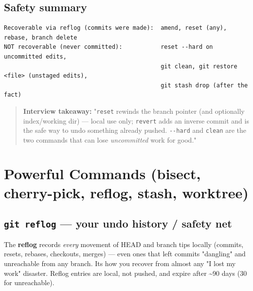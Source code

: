 \documentclass[11pt]{article}
\newenvironment{Shaded}{\begin{snugshade}}{\end{snugshade}}
\newcommand{\ExtensionTok}[1]{\textcolor[rgb]{0.00,0.60,1.00}{\textbf{#1}}}
\newcommand{\NormalTok}[1]{\textcolor[rgb]{0.81,0.81,0.76}{#1}}
\begin{document}
\subsection{Safety summary}\label{safety-summary}

\setcodelang{}

\begin{verbatim}
Recoverable via reflog (commits were made):  amend, reset (any), rebase, branch delete
NOT recoverable (never committed):           reset --hard on uncommitted edits,
                                             git clean, git restore <file> (unstaged edits),
                                             git stash drop (after the fact)
\end{verbatim}

\begin{quote}
\textbf{Interview takeaway:} "\texttt{reset} rewinds the branch pointer (and optionally index/working dir) --- local use only; \texttt{revert} adds an inverse commit and is the safe way to undo something already pushed. \texttt{-\/-hard} and \texttt{clean} are the two commands that can lose \emph{uncommitted} work for good."
\end{quote}

\section{Powerful Commands (bisect, cherry-pick, reflog, stash, worktree)}\label{powerful-commands-bisect-cherry-pick-reflog-stash-worktree}

\subsection{\texorpdfstring{\texttt{git\ reflog} --- your undo history / safety net}{git reflog --- your undo history / safety net}}\label{git-reflog--your-undo-history--safety-net}

The \textbf{reflog} records \emph{every} movement of HEAD and branch tips locally (commits, resets, rebases, checkouts, merges) --- even ones that left commits "dangling" and unreachable from any branch. It\textquotesingle s how you recover from almost any "I lost my work" disaster. Reflog entries are local, not pushed, and expire after \textasciitilde90 days (30 for unreachable).


\begin{Shaded}
\end{Shaded}
\end{document}
